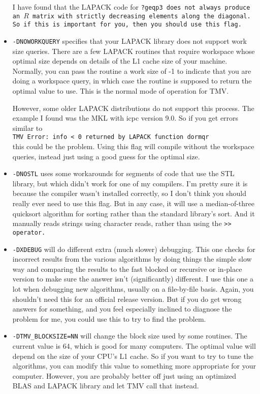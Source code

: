 \begin{itemize}
I have found that the LAPACK code for \tt{?geqp3} does not always
produce an $R$ matrix
with strictly decreasing elements along the diagonal.  So if this is important
for you, then you should use this flag.
\item
{}
\texttt{-DNOWORKQUERY} specifies that your LAPACK library does not support
work size queries.  There are a few LAPACK routines that require workspace whose
optimal size depends on details of the L1 cache size of your machine.  Normally,
you can pass the routine a work size of -1 to indicate that you are doing a workspace
query, in which case the routine is supposed to return the optimal value to use.  This is the normal
mode of operation for TMV.  

However, some older LAPACK distributions do not support
this process.  The example I found was the MKL with icpc version 9.0.
So if you get errors similar to \\
\texttt{TMV Error: info < 0 returned by LAPACK function dormqr}\\
this could be the problem.  Using this flag will compile without the workspace queries, instead just
using a good guess for the optimal size.

\item
\texttt{-DNOSTL} uses some workarounds for segments of code that use the STL
library, but which didn't work for one of my compilers.  I'm pretty sure it is
because the compiler wasn't installed correctly, so I don't think you
should really ever need to use this flag.  
But in any case, it 
will use a median-of-three quicksort algorithm for sorting
rather than the standard library's sort.  And it manually reads strings 
using character reads, rather than using the \tt{>>} operator.  

\item
\texttt{-DXDEBUG} will do different extra (much slower) debugging.  This one checks for
incorrect results from the various algorithms by doing things the simple slow way
and comparing the results to the fast blocked or recursive or in-place version
to make sure the answer isn't (significantly) different.  
I use this one a lot when debugging
new algorithms, usually on a file-by-file basis.  Again, you shouldn't need this for
an official release version.  But if you do get wrong answers for something, and you 
feel especially inclined to diagnose the problem for me, you could
use this to try to find the problem.

\item
\texttt{-DTMV\_BLOCKSIZE=NN} will change the block size used by some routines.  
The current value is 64, which is good for many computers.  
The optimal value will depend on the size of your
CPU's L1 cache.  So if you want to try to tune the algorithms, you can 
modify this value to something more appropriate for your computer.
However, you are probably better off just using an optimized BLAS and LAPACK
library and let TMV call that instead.
\end{itemize}


